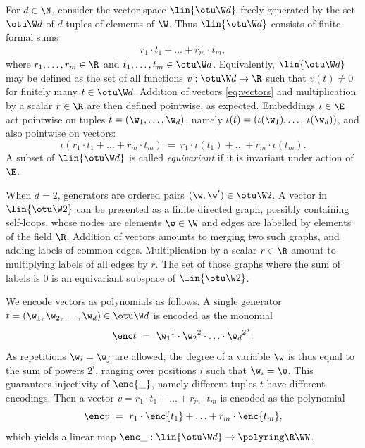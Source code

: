 For $d\in\N$, consider the vector space $\lin {\otu \W d}$ freely generated by the set $\otu \W d$
of $d$-tuples of elements of $\W$.
Thus $\lin {\otu \W d}$ consists of finite formal sums 
\begin{align} \label{eq:vectors}
r_1 \cdot t_1 + \ldots + r_m \cdot t_m,
\end{align}
where $r_1, \ldots, r_m \in \R$ and $t_1, \ldots, t_m \in \otu \W d$.
Equivalently, $\lin{\otu \W d}$ may be defined as the set of all functions $v : \otu \W d \to \R$
such that $v(t) \neq 0$ for finitely many $t\in\otu\W d$.
Addition of vectors \eqref{eq:vectors} and multiplication by a scalar $r\in\R$ are then defined 
pointwise, as expected.
Embeddings $\iota\in\E$ act 
pointwise on tuples $t = (\w_1, \ldots, \w_d)$, namely
$\iota(t) = (\iota(\w_1), \ldots$, $\iota(\w_d))$, and also pointwise on vectors:
\[
\iota(r_1 \cdot t_1 + \ldots + r_m \cdot t_m) \ = \ 
r_1 \cdot \iota(t_1) + \ldots + r_m \cdot \iota(t_m).
\]
%
A subset of $\lin{\otu \W d}$ is called \emph{equivariant} if it is invariant under 
action of $\E$.

\begin{slexample}
When $d = 2$, generators are ordered pairs $(\w, \w')\in\otu \W 2$.
A vector in $\lin {\otu \W 2}$ can be presented as a finite directed graph, 
possibly containing self-loops,
whose nodes are elements $\w\in\W$ and edges
are labelled by elements of the field $\R$.
Addition of vectors amounts to merging two such graphs, and adding labels of common edges.
Multiplication by a scalar $r\in\R$ amount to multiplying labels of all edges by $r$.
The set of those graphs where the sum of labels is 0 is an equivariant subspace of $\lin {\otu \W 2}$.
\end{slexample}

We encode vectors as polynomials as follows.
A single generator $t = (\w_1, \w_2, \ldots, \w_d) \in \otu \W d$ is encoded as the monomial
\[
\enc t \ = \ {\w_1}^{1} \cdot {\w_2}^{2} \cdot \ldots \cdot {\w_d}^{2^d}.
\]
As repetitions $\w_i = \w_j$ are allowed, the
degree of a variable $\w$ is thus equal to the sum of powers $2^i$, ranging over 
positions $i$ such that $\w_i = \w$.
This guarantees injectivity of $\enc{\_}$, namely different tuples $t$ have different encodings.
Then a vector $v = r_1 \cdot t_1 + \ldots + r_m \cdot t_m$ is encoded as the polynomial
\[
\enc v \ = \ r_1 \cdot \enc{t_1} + \ldots + r_m \cdot \enc{t_m},
\]
which yields a linear map $\enc \_ : \lin{\otu \W d} \to \polyring \R \WW$.

